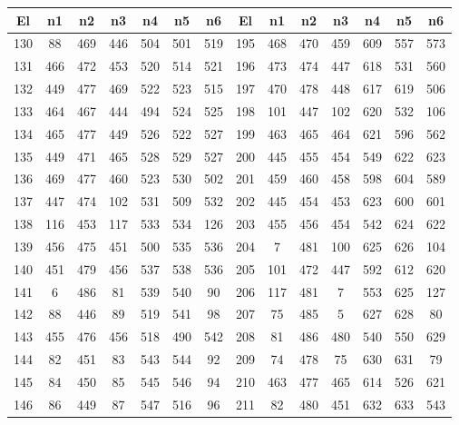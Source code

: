 \begin{apendicesenv}
\begin{table}[H]
	\centering
	\scriptsize
	\begin{tabular}{@{}ccccccc@{\hspace{1.0cm}}ccccccc@{}}
		\toprule
		 \centering El & n1 & n2 & n3 & n4 & n5 & n6 & El & n1 & n2 & n3 & n4 & n5 & n6 \\
		\midrule
		130 &   88 &  469 &  446 &  504 &  501 &  519 & 195 &  468 &  470 &  459 &  609 &  557 &  573 \\
		131 &  466 &  472 &  453 &  520 &  514 &  521 & 196 &  473 &  474 &  447 &  618 &  531 &  560 \\
		132 &  449 &  477 &  469 &  522 &  523 &  515 & 197 &  470 &  478 &  448 &  617 &  619 &  506 \\
		133 &  464 &  467 &  444 &  494 &  524 &  525 & 198 &  101 &  447 &  102 &  620 &  532 &  106 \\
		134 &  465 &  477 &  449 &  526 &  522 &  527 & 199 &  463 &  465 &  464 &  621 &  596 &  562 \\
		135 &  449 &  471 &  465 &  528 &  529 &  527 & 200 &  445 &  455 &  454 &  549 &  622 &  623 \\
		136 &  469 &  477 &  460 &  523 &  530 &  502 & 201 &  459 &  460 &  458 &  598 &  604 &  589 \\
		137 &  447 &  474 &  102 &  531 &  509 &  532 & 202 &  445 &  454 &  453 &  623 &  600 &  601 \\
		138 &  116 &  453 &  117 &  533 &  534 &  126 & 203 &  455 &  456 &  454 &  542 &  624 &  622 \\
		139 &  456 &  475 &  451 &  500 &  535 &  536 & 204 &    7 &  481 &  100 &  625 &  626 &  104 \\
		140 &  451 &  479 &  456 &  537 &  538 &  536 & 205 &  101 &  472 &  447 &  592 &  612 &  620 \\
		141 &    6 &  486 &   81 &  539 &  540 &   90 & 206 &  117 &  481 &    7 &  553 &  625 &  127 \\
		142 &   88 &  446 &   89 &  519 &  541 &   98 & 207 &   75 &  485 &    5 &  627 &  628 &   80 \\
		143 &  455 &  476 &  456 &  518 &  490 &  542 & 208 &   81 &  486 &  480 &  540 &  550 &  629 \\
		144 &   82 &  451 &   83 &  543 &  544 &   92 & 209 &   74 &  478 &   75 &  630 &  631 &   79 \\
		145 &   84 &  450 &   85 &  545 &  546 &   94 & 210 &  463 &  477 &  465 &  614 &  526 &  621 \\
		146 &   86 &  449 &   87 &  547 &  516 &   96 & 211 &   82 &  480 &  451 &  632 &  633 &  543 \\

\end{tabular}
\end{table}
\end{apendicesenv}
